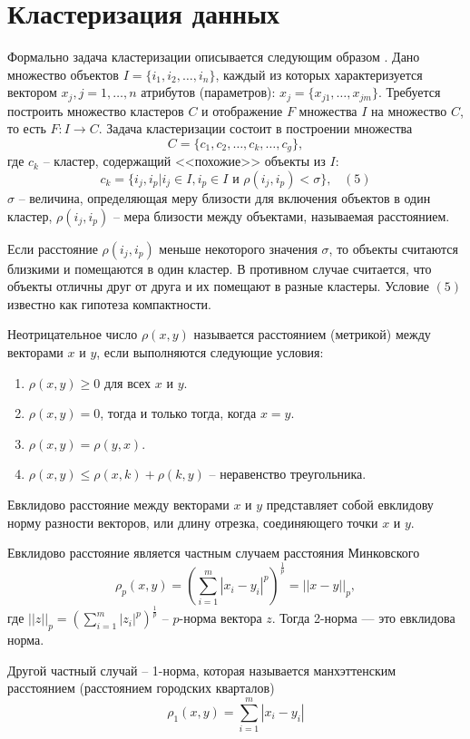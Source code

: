 \documentclass[bachelor, och, referat]{SCWorks}
\begin{document}
\section{Кластеризация данных}
Формально задача кластеризации описывается следующим образом \cite{cluster}.
Дано множество объектов $I = \{ i_1, i_2, \dots, i_n \}$, 
каждый из которых характеризуется вектором $x_j, j = 1, \dots, n$
атрибутов (параметров): $x_j = \{ x_{j1}, \dots, x_{jm} \}$.
Требуется построить множество кластеров $C$ и отображение $F$
множества $I$ на множество $C$, то есть $F: I \rightarrow C$.
Задача кластеризации состоит в построении множества
\[ C = \{ c_1, c_2, \dots, c_k, \dots, c_g \}, \]
где $c_k$ -- кластер, содержащий <<похожие>> объекты из $I$:
\[ c_k = \{ i_j, i_p | i_j \in I, i_p \in I \text{ и } \rho(i_j, i_p) < \sigma \}, \; \; \; (5) \]
$\sigma$ -- величина, определяющая меру близости для включения объектов
в один кластер, $\rho(i_j, i_p)$ -- мера близости между объектами,
называемая расстоянием.

Если расстояние $\rho(i_j, i_p)$ меньше некоторого значения $\sigma$,
то объекты считаются близкими и помещаются в один кластер.
В противном случае считается, что объекты отличны друг от друга и их помещают в разные
кластеры. Условие $(5)$ известно как гипотеза компактности. 

Неотрицательное число $\rho(x, y)$ называется расстоянием (метрикой)
между векторами $x$ и $y$, если выполняются следующие условия: 
\begin{enumerate}
    \item $\rho(x, y) \geq 0$ для всех $x$ и $y$.
    \item $\rho(x, y) = 0$, тогда и только тогда, когда $x = y$.
    \item $\rho(x, y) = \rho(y, x)$.
    \item $\rho(x, y) \leq \rho(x, k) + \rho(k, y)$ -- неравенство треугольника.
\end{enumerate}

Евклидово расстояние между векторами $x$ и $y$ представляет собой 
евклидову норму разности векторов, или длину отрезка, соединяющего точки
$x$ и $y$. 

Евклидово расстояние является частным случаем расстояния
Минковского
\[ \rho_p(x, y) = (\sum_{i = 1}^{m}|x_i - y_i|^p)^{\frac{1}{p}} = ||x - y||_p, \]
где $||z||_p = \displaystyle(\sum_{i = 1}^{m}|z_i|^p)^{\frac{1}{p}}$ -- $p$-норма вектора $z$.
Тогда 2-норма — это евклидова норма. 

Другой частный случай -- 1-норма, которая называется манхэттенским
расстоянием (расстоянием городских кварталов)
\[ \rho_1(x, y) = \sum_{i = 1}^{m} |x_i - y_i| \]
\end{document}
